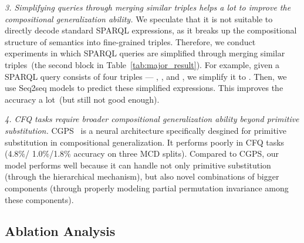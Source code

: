 \documentclass{article}
\begin{document}
\emph{3. Simplifying queries through merging similar triples helps a lot to improve the compositional generalization ability.}
We speculate that it is not suitable to directly decode standard SPARQL expressions, as it breaks up the compositional structure of semantics into fine-grained triples.
Therefore, we conduct experiments in which SPARQL queries are simplified through merging similar triples~(the second block in Table~\ref{tab:major_result}).
For example, given a SPARQL query consists of four triples --- , ,  and , we simplify it to .
Then, we use Seq2seq models to predict these simplified expressions.
This improves the accuracy a lot~(but still not good enough).

\emph{4. CFQ tasks require broader compositional generalization ability beyond primitive substitution.}
CGPS~\citep{li2019compositional} is a neural architecture specifically desgined for primitive substitution in compositional generalization.
It performs poorly in CFQ tasks (4.8\%/ 1.0\%/1.8\% accuracy on three MCD splits).
Compared to CGPS, our model performs well because it can handle not only primitive substitution (through the hierarchical mechanism), but also novel combinations of bigger components (through properly modeling partial permutation invariance among these components).









\subsection{Ablation Analysis}
\end{document}

